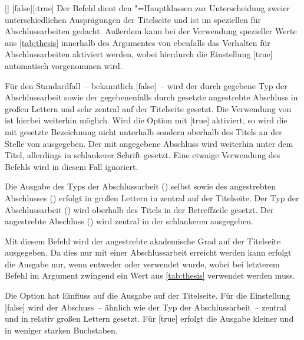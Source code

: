 \begin{Declaration}{[\PBoolean]}%
  [false][:true]
\printdeclarationlist%
%
Der Befehl  dient den \TUDScript"=Hauptklassen zur Unterscheidung 
zweier unterschiedlichen Ausprägungen der Titelseite und ist im speziellen für 
Abschlussarbeiten gedacht. Außerdem kann bei der Verwendung spezieller Werte 
aus \autoref{tab:thesis} innerhalb des Argumentes von  ebenfalls 
das Verhalten für Abschlussarbeiten aktiviert werden, wobei hierdurch die 
Einstellung [true] automatisch vorgenommen wird.

Für den Standardfall~-- bekanntlich [false]~-- wird der 
durch  gegebene Typ der Abschlussarbeit sowie der gegebenenfalls 
durch  gesetzte angestrebte Abschluss in großen Lettern und 
sehr zentral auf der Titelseite gesetzt. Die Verwendung von  ist 
hierbei weiterhin möglich.
%
Wird die Option mit [true] aktiviert, so wird die mit 
 gesetzte Bezeichnung nicht unterhalb sondern oberhalb des Titels 
an der Stelle von  ausgegeben. Der mit  
angegebene Abschluss wird weiterhin unter dem Titel, allerdings in schlankerer 
Schrift gesetzt. Eine etwaige Verwendung des Befehls  wird in 
diesem Fall ignoriert.
%
\begin{values}
\itemfalse
  Die Ausgabe des Typs der Abschlussarbeit () selbst sowie des 
  angestrebten Abschlusses () erfolgt in großen Lettern in 
  \DIN zentral auf der Titelseite.
\itemtrue*
  Der Typ der Abschlussarbeit () wird oberhalb des Titels in der 
  Betreffzeile gesetzt. Der angestrebte Abschluss () wird 
  zentral in der schlankeren \Univers ausgegeben.
\end{values}
\end{Declaration}

\begin{Declaration}{}
\printdeclarationlist%
%
%
Mit diesem Befehl wird der angestrebte akademische Grad auf der Titelseite 
ausgegeben. Da dies nur mit einer Abschlussarbeit erreicht werden kann erfolgt 
die Ausgabe nur, wenn entweder  oder  verwendet 
wurde, wobei bei letzterem Befehl im Argument zwingend ein Wert aus 
\autoref{tab:thesis} verwendet werden muss.

Die Option  hat Einfluss auf die Ausgabe auf der 
Titelseite. Für die Einstellung [false] wird der 
Abschuss~-- ähnlich wie 
der Typ der Abschlussarbeit~-- zentral und in relativ großen Lettern gesetzt. 
Für [true] erfolgt die Ausgabe kleiner und in weniger 
starken Buchstaben.
\end{Declaration}

